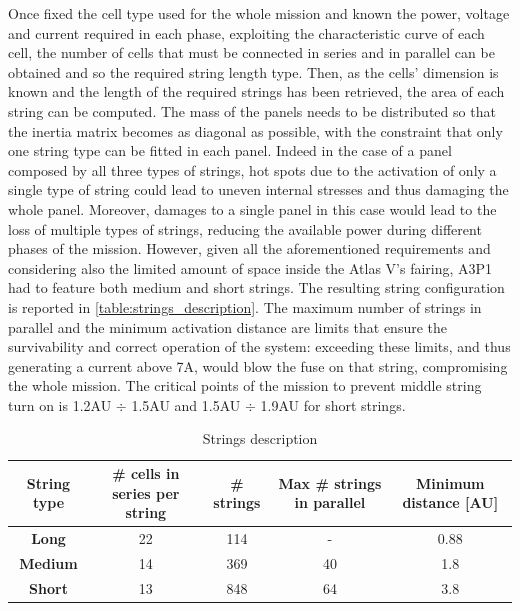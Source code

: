 Once fixed the cell type used for the whole mission and known the power, voltage and current required in each phase, exploiting the characteristic curve of each cell, the number of cells that must be connected in series and in parallel can be obtained and so the required string length type. Then, as the cells' dimension is known and the length of the required strings has been retrieved, the area of each string can be computed. The mass of the panels needs to be distributed so that the inertia matrix becomes as diagonal as possible, with the constraint that only one string type can be fitted in each panel.\cite{solar_panels_coef} Indeed in the case of a panel composed by all three types of strings, hot spots due to the activation of only a single type of string could lead to uneven internal stresses and thus damaging the whole panel. Moreover, damages to a single panel in this case would lead to the loss of multiple types of strings, reducing the available power during different phases of the mission.  However, given all the aforementioned requirements and considering also the limited amount of space inside the Atlas V's fairing, A3P1 had to feature both medium and short strings.\cite{solar_panels_coef} The resulting string configuration is reported in \autoref{table:strings_description}. The maximum number of strings in parallel and the minimum activation distance are limits that ensure the survivability and correct operation of the system: exceeding these limits, and thus generating a current above 7A, would blow the fuse on that string, compromising the whole mission. The critical points of the mission to prevent middle string turn on is 1.2AU $\div$ 1.5AU and 1.5AU $\div$ 1.9AU for short strings.\cite{solar_panels_coef}

 \begin{table}[H]
    \renewcommand{\arraystretch}{1.3}
    \centering
    \small
\begin{tabular}{|c|c|c|c|c|}
    \hline
    \textbf{String type} & \textbf{\# cells in series per string} & \textbf{\# strings} & \textbf{Max \# strings in parallel} & \textbf{Minimum distance [AU]}\\
    \hline
    \hline
    \textbf{Long}    &  22 & 114 & - & 0.88 \\
    \hline
    \textbf{Medium}  &  14 & 369 & 40 & 1.8\\
    \hline
    \textbf{Short}   &  13 & 848 & 64 & 3.8 \\
    \hline
\end{tabular}
\caption{Strings description}
\label{table:strings_description}
\end{table}


